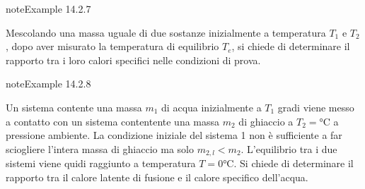 \documentclass[letterpaper,10pt,italian]{jupyterBook}
\begin{document}
\begin{sphinxadmonition}{note}{Example 14.2.7}



\sphinxAtStartPar
Mescolando una massa uguale di due sostanze inizialmente a temperatura \(T_1\)  e \(T_2\), dopo aver misurato la temperatura di equilibrio \(T_e\), si chiede di determinare il rapporto tra i loro calori specifici nelle condizioni di prova.
\end{sphinxadmonition}
\label{ch/thermodynamics/foundation-experiments:thermodynamics:history:heat-capacity:4}
\begin{sphinxadmonition}{note}{Example 14.2.8}



\sphinxAtStartPar
Un sistema contente una massa \(m_1\) di acqua inizialmente a \(T_1\) gradi viene messo a contatto con un sistema contentente una massa \(m_2\) di ghiaccio a \(T_2 = \text{°C}\) a pressione ambiente. La condizione iniziale del sistema 1 non è sufficiente a far sciogliere l’intera massa di ghiaccio ma solo \(m_{2,l} < m_2\). L’equilibrio tra i due sistemi viene quidi raggiunto a temperatura \(T=0 \text{°C}\). Si chiede di determinare il rapporto tra il calore latente di fusione e il calore specifico dell’acqua.
\end{sphinxadmonition}
\label{ch/thermodynamics/foundation-experiments:thermodynamics:history:heat-capacity:unit}
\end{document}
